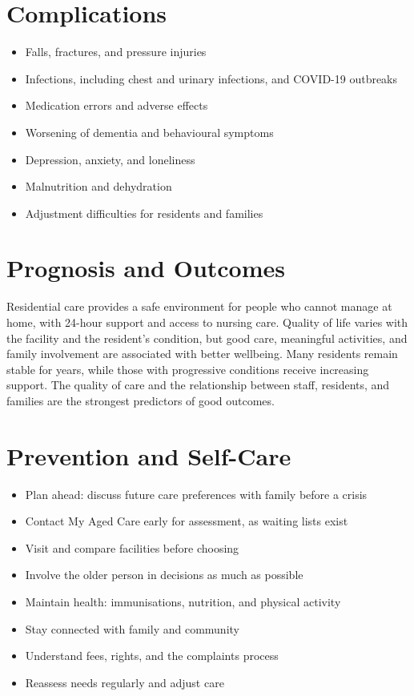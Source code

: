 \section*{Complications}
\begin{itemize}
    \item Falls, fractures, and pressure injuries
    \item Infections, including chest and urinary infections, and COVID-19 outbreaks
    \item Medication errors and adverse effects
    \item Worsening of dementia and behavioural symptoms
    \item Depression, anxiety, and loneliness
    \item Malnutrition and dehydration
    \item Adjustment difficulties for residents and families
\end{itemize}

\section*{Prognosis and Outcomes}
Residential care provides a safe environment for people who cannot manage at home, with 24-hour support and access to nursing care. Quality of life varies with the facility and the resident's condition, but good care, meaningful activities, and family involvement are associated with better wellbeing. Many residents remain stable for years, while those with progressive conditions receive increasing support. The quality of care and the relationship between staff, residents, and families are the strongest predictors of good outcomes.

\section*{Prevention and Self-Care}
\begin{itemize}
    \item Plan ahead: discuss future care preferences with family before a crisis
    \item Contact My Aged Care early for assessment, as waiting lists exist
    \item Visit and compare facilities before choosing
    \item Involve the older person in decisions as much as possible
    \item Maintain health: immunisations, nutrition, and physical activity
    \item Stay connected with family and community
    \item Understand fees, rights, and the complaints process
    \item Reassess needs regularly and adjust care
\end{itemize}


